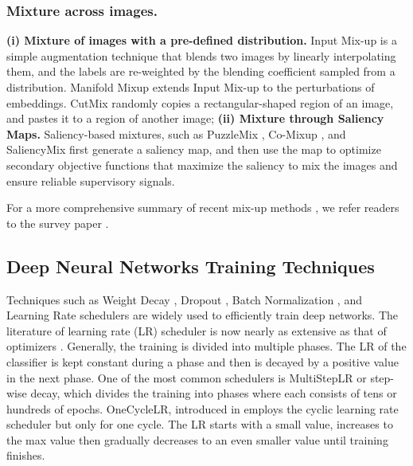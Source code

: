 \documentclass[letterpaper]{article} \usepackage[submission]{aaai23}  \usepackage{times}  \usepackage{helvet}  \usepackage{courier}  \usepackage[hyphens]{url}  \usepackage{graphicx} \urlstyle{rm} \def\UrlFont{\rm}  \usepackage{natbib}  \usepackage{caption} \frenchspacing  \setlength{\pdfpagewidth}{8.5in} \setlength{\pdfpageheight}{11in}
\newcommand{\mixup}{Input Mix-up}
\newcommand{\cutmix}{{CutMix}}
\newcommand{\puzzlemix}{{PuzzleMix}}
\newcommand{\comixup}{{Co-Mixup}}
\newcommand{\manifoldmixup}{{Manifold Mixup}}
\newcommand{\saliencymix}{{SaliencyMix}}
\begin{document}
\subsubsection{Mixture across images.} 
\textbf{(i) Mixture of images with a pre-defined distribution.} \mixup{} \cite{zhang2018mixup} is a simple augmentation technique that blends two images by linearly interpolating them, and the labels are re-weighted by the blending coefficient sampled from a distribution. \manifoldmixup{} \cite{verma2019manifold} extends \mixup{} to the perturbations of embeddings. \cutmix{} \cite{yun2019cutmix} randomly copies a rectangular-shaped region of an image, and pastes it to a region of another image; \textbf{(ii) Mixture through Saliency Maps.} Saliency-based mixtures, such as \puzzlemix{} \cite{kim2020puzzlemix}, \comixup{} \cite{kim2021comixup}, and \saliencymix{} \cite{uddin2021saliencymix} first generate a saliency map, and then use the map to optimize secondary objective functions that maximize the saliency to mix the images and ensure reliable supervisory signals.

For a more comprehensive summary of recent mix-up methods \cite{mixup1, mixup2, mixup4, mixup6, mixup9, mixup10, mixup12, mixup13}, we refer readers to the survey paper \cite{naveed2021survey}.


\subsection{Deep Neural Networks Training Techniques}
Techniques such as Weight Decay \cite{Goodfellow-et-al-2016}, Dropout \cite{dropout}, Batch Normalization \cite{ioffe2015batch}, and Learning Rate schedulers are widely used to efficiently train deep networks.
The literature of learning rate (LR) scheduler is now nearly as extensive as that of optimizers \cite{pmlr-v139-schmidt21a}. Generally, the training is divided into multiple phases. The LR of the classifier is kept constant during a phase and then is decayed by a positive value in the next phase. One of the most common schedulers is MultiStepLR \cite{Goodfellow-et-al-2016,zhang2021dive} or step-wise decay, which divides the training into phases where each consists of tens or hundreds of epochs.
OneCycleLR, introduced in \cite{smith2018superconvergence} employs the cyclic learning rate scheduler \cite{smith2017cyclical} but only for one cycle. The LR starts with a small value, increases to the max value then gradually decreases to an even smaller value until training finishes.
\end{document}
